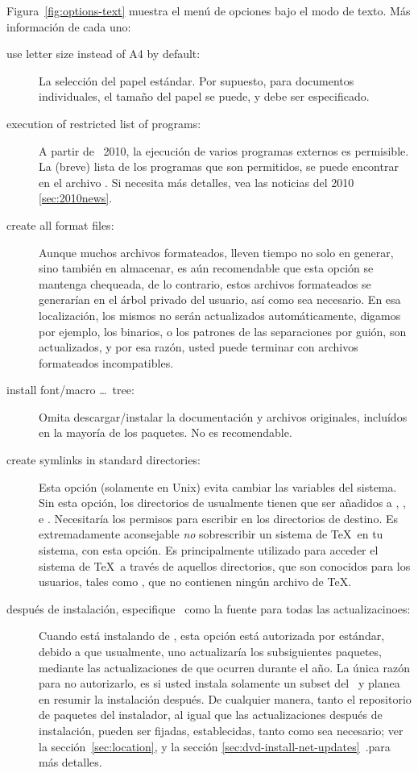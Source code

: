 \documentclass{article}
\begin{document}
Figura~\ref{fig:options-text} muestra el menú de opciones bajo el modo de texto. 
Más información de cada uno:

\begin{description}
\item[use letter size instead of A4 by default:] La selección del
	papel estándar. Por supuesto, para documentos individuales, el
	tamaño del papel se puede, y debe ser especificado.  

\item[execution of restricted list of programs:] A partir de \TL\
	2010, la ejecución de varios programas externos es permisible.
	La (breve) lista de los programas que son permitidos, se puede
	encontrar en el archivo . Si necesita más
	detalles, vea las noticias del 2010 \ref{sec:2010news}.

\item[create all format files:] Aunque muchos archivos formateados,
	lleven tiempo no solo en generar, sino también en almacenar, es
	aún recomendable que esta opción se mantenga chequeada,
	de lo contrario, estos archivos formateados se
	generarían en el árbol privado del usuario, así como sea
	necesario. En esa localización, los mismos no serán
	actualizados automáticamente, digamos por ejemplo, los binarios,
	o los patrones de las separaciones por guión, son
	actualizados, y por esa razón, usted puede terminar con
	archivos formateados incompatibles. 

\item[install font/macro \ldots\ tree:] Omita descargar/instalar la
	documentación y archivos originales, incluídos en la mayoría de
	los paquetes. No es recomendable. 

\item[create symlinks in standard directories:] Esta opción (solamente
	en Unix) evita cambiar las variables del sistema. Sin esta
	opción, los directorios de \TL{} usualmente tienen que ser
	añadidos a , , e
	. Necesitaría los permisos para escribir en
	los directorios de destino. Es extremadamente aconsejable
	\emph{no} sobrescribir un sistema de \TeX\ en tu sistema, con
	esta opción. Es principalmente utilizado para acceder el
	sistema de \TeX\ a través de aquellos directorios, que son
	conocidos para los usuarios, tales como
	, que no contienen ningún archivo de
	\TeX.

\item[después de instalación, especifique \CTAN\ como la fuente para
	todas las actualizacinoes:] Cuando está instalando de \DVD, esta
	opción está autorizada por estándar, debido a que
	usualmente, uno actualizaría los subsiguientes paquetes,
	mediante las actualizaciones de \CTAN que ocurren
	durante el año. La única razón para no autorizarlo, es
	si usted instala solamente un subset del \DVD\ y planea
	en resumir la instalación después. De cualquier manera,
	tanto el repositorio de paquetes del instalador, al
	igual que las actualizaciones después de instalación,
	pueden ser fijadas, establecidas, tanto como sea
	necesario; ver la sección~\ref{sec:location}, y la
sección \ref{sec:dvd-install-net-updates}~.para más detalles.  
\end{description}
\end{document}
